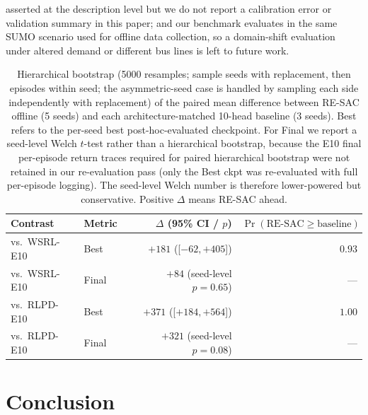 \documentclass[journal,10pt]{IEEEtran}
\begin{document}
asserted at the description level but we do not report a calibration error or validation summary in this paper; and our benchmark evaluates in the same SUMO scenario used for offline data collection, so a domain-shift evaluation under altered demand or different bus lines is left to future work.

\begin{table}[!t]
\centering
\caption{Hierarchical bootstrap (5000 resamples; sample seeds with replacement, then episodes within seed; the asymmetric-seed case is handled by sampling each side independently with replacement) of the paired mean difference between RE-SAC offline (5 seeds) and each architecture-matched 10-head baseline (3 seeds). Best refers to the per-seed best post-hoc-evaluated checkpoint. For Final we report a seed-level Welch $t$-test rather than a hierarchical bootstrap, because the E10 final per-episode return traces required for paired hierarchical bootstrap were not retained in our re-evaluation pass (only the Best ckpt was re-evaluated with full per-episode logging). The seed-level Welch number is therefore lower-powered but conservative. Positive $\Delta$ means RE-SAC ahead.}
\label{tab:hierboot_E10}
\footnotesize
\setlength{\tabcolsep}{6pt}
\begin{tabular}{@{}llrr@{}}
\toprule
Contrast & Metric & $\Delta$ (95\% CI / $p$) & $\Pr(\text{RE-SAC} \geq \text{baseline})$ \\
\midrule
vs.\ WSRL-E10 & Best  & $+181$ \;([$-62, +405$])     & $0.93$ \\
vs.\ WSRL-E10 & Final & $+84$ \;(seed-level $p\!=\!0.65$) & --- \\
vs.\ RLPD-E10 & Best  & $+371$ \;([$+184, +564$])    & $1.00$ \\
vs.\ RLPD-E10 & Final & $+321$ \;(seed-level $p\!=\!0.08$) & --- \\
\bottomrule
\end{tabular}
\end{table}

\section{Conclusion}
\label{sec:conclusion}
\end{document}
